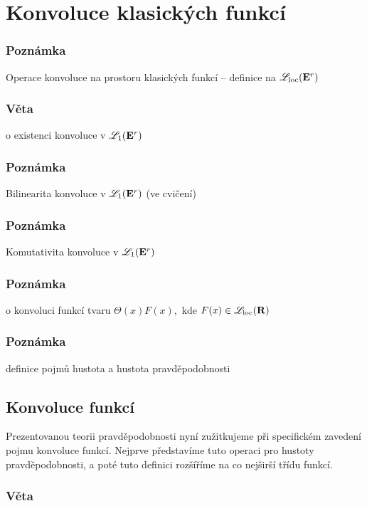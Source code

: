 \chapter{Konvoluce klasick\'ych funkc\'i}




\subsection{Pozn\'amka}
Operace konvoluce na prostoru klasick\'ych funkc\'i -- definice na $\mathscr{L}_{\mathrm{loc}}({{\mathbf E}^r})$
\subsection{V\v eta}
o existenci konvoluce v ${\mathscr L}_1({{\mathbf E}^r})$
\subsection{Pozn\'amka}
Bilinearita konvoluce v ${\mathscr L}_1({{\mathbf E}^r})$ (ve cvi\v cen\'i)
\subsection{Pozn\'amka}
Komutativita konvoluce v ${\mathscr L}_1({{\mathbf E}^r})$
\subsection{Pozn\'amka}
o konvoluci funkc\'i tvaru $\Theta(x)F(x),$ kde $F(x)\in\mathscr{L}_{\mathrm{loc}}({\mathbf R})$
\subsection{Pozn\'amka}
definice pojm\r u hustota a hustota pravd\v epodobnosti







\section{Konvoluce funkc\'i}
Prezentovanou teorii pravd\v epodobnosti nyn\'i zu\v zitkujeme p\v ri specifick\'em zaveden\'i pojmu konvoluce funkc\'i. Nejprve p\v redstav\'ime tuto operaci pro hustoty pravd\v epodobnosti, a pot\'e tuto definici roz\v s\'i\v r\'ime na co nej\v sir\v s\'i t\v r\'idu funkc\'i.

\subsection{V\v eta}\label{odvozeni_konvoluce}

